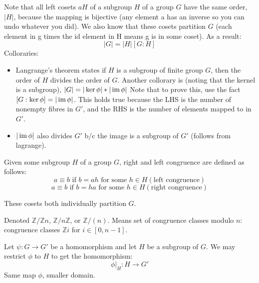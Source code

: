 \begin{definition}
  Note that all left cosets $aH$ of a subgroup $H$ of a group $G$ have the same
  order, $|H|$, because the mapping is bijective (any element a has an inverse so
  you can undo whatever you did). We also know that these cosets partition $G$
  (each element in g times the id element in H means g is in some coset). As a
  result:
  \[|G| = |H|[G:H]\]
  Colloraries:
  \begin{itemize}
    \item
      Langrange's theorem states if $H$ is a subgroup of finite group $G$, then
      the order of $H$ divides the order of $G$. Another collorary is (noting that the
      kernel is a subgroup), $|G| = |\ker \phi| * | \operatorname{im} \phi |$ Note that to prove
      this, use the fact $[G:\ker \phi] = | \operatorname{im} \phi |$. This holds true because the
      LHS is the number of nonempty fibres in $G'$, and the RHS is the number of
      elements mapped to in $G'$.
    \item $|\operatorname{im} \phi|$ also divides $G'$ b/c the image is a subgroup of $G'$
      (follows from lagrange).
  \end{itemize}
\end{definition}

\begin{definition}

  Given some subgroup $H$ of a group $G$, right and left congruence are defined
  as follows:
  \[a \equiv b \text{ if } b = ah \text{ for some } h \in H  (\text{left congruence})\]
  \[a \equiv b \text{ if } b = ha \text{ for some } h \in H  (\text{right congruence})\]

  These cosets both individually partition $G$.

\end{definition}

\begin{definition}

  Denoted $\mathbb{Z}/ \mathbb{Z}n$, $\mathbb{Z} / n \mathbb{Z}$, or
  $\mathbb{Z}/(n)$. Means set of congruence classes modulo $n: $congruence
  classes $\mathbb{Z}i$ for $i \in[0,n-1]$.

\end{definition}

\begin{definition}

  Let $\psi:G \rightarrow G'$ be a homomorphism and let $H$ be a subgroup of $G$. We may
  restrict $\phi$ to $H$ to get the homomorphism:
  \[\phi|_{H}: H \rightarrow G'\]
  Same map $\phi$, smaller domain.

\end{definition}

